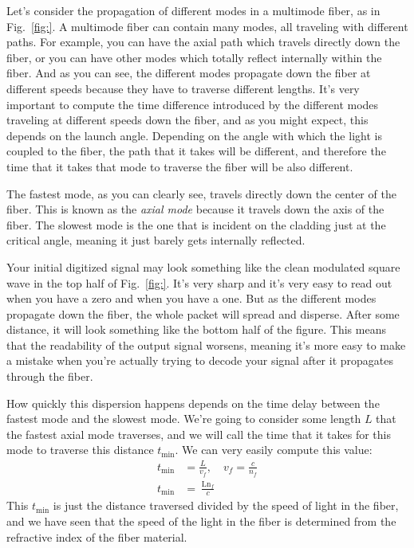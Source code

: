 Let's consider the propagation of different modes in a multimode fiber, as in Fig.~\ref{fig:}. A multimode fiber can contain many modes, all traveling with different paths. For example, you can have the axial path which travels directly down the fiber, or you can have other modes which totally reflect internally within the fiber. And as you can see, the different modes propagate down the fiber at different speeds because they have to traverse different lengths. It's very important to compute the time difference introduced by the different modes traveling at different speeds down the fiber, and as you might expect, this depends on the launch angle. Depending on the angle with which the light is coupled to the fiber, the path that it takes will be different, and therefore the time that it takes that mode to traverse the fiber will be also different.

The fastest mode, as you can clearly see, travels directly down the center of the fiber. This is known as the \emph{axial mode} because it travels down the axis of the fiber. The slowest mode is the one that is incident on the cladding just at the critical angle, meaning it just barely gets internally reflected.

Your initial digitized signal may look something like the clean modulated square wave in the top half of Fig.~\ref{fig:}. It's very sharp and it's very easy to read out when you have a zero and when you have a one. But as the different modes propagate down the fiber, the whole packet will spread and disperse. After some distance, it will look something like the bottom half of the figure.
This means that the readability of the output signal worsens, meaning it's more easy to make a mistake when you're actually trying to decode your signal after it propagates through the fiber.

How quickly this dispersion happens depends on the time delay between the fastest mode and the slowest mode. We're going to consider some length $L$ that the fastest axial mode traverses, and we will call the time that it takes for this mode to traverse this distance $t_{\mathrm{min}}$. We can very easily compute this value:
\begin{equation}
\begin{aligned}
t_{\min } &=\frac{L}{v_f}, \quad v_f=\frac{c}{n_f} \\
t_{\min } &=\frac{\operatorname{Ln}_f}{c}
\end{aligned}
\end{equation}
This $t_{\mathrm{min}}$ is just the distance traversed divided by the speed of light in the fiber, and we have seen that the speed of the light in the fiber is determined from the refractive index of the fiber material.

